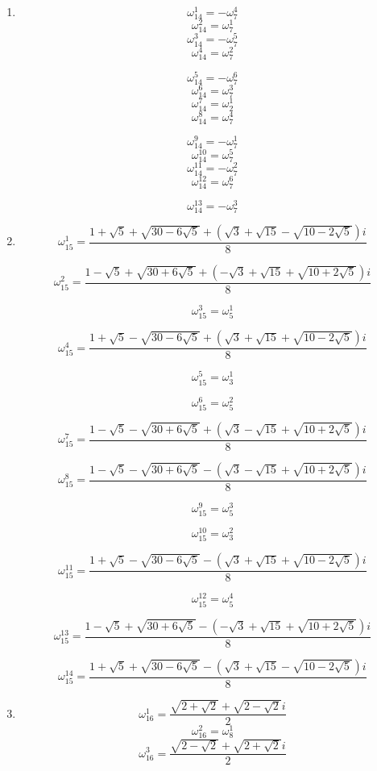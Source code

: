 \documentclass{article}
\begin{document}
\begin{enumerate}
\item \[ \omega_{14}^{1}=-\omega_{7}^{4} \]
\[ \omega_{14}^{2}=\omega_{7}^{1} \]
\[ \omega_{14}^{3}=-\omega_{7}^{5} \]
\[ \omega_{14}^{4}=\omega_{7}^{2} \]

\[ \omega_{14}^{5}=-\omega_{7}^{6} \]
\[ \omega_{14}^{6}=\omega_{7}^{3} \]
\[ \omega_{14}^{7}=\omega_{2}^{1} \]
\[ \omega_{14}^{8}=\omega_{7}^{4} \]

\[ \omega_{14}^{9}=-\omega_{7}^{1} \]
\[ \omega_{14}^{10}=\omega_{7}^{5} \]
\[ \omega_{14}^{11}=-\omega_{7}^{2} \]
\[ \omega_{14}^{12}=\omega_{7}^{6} \]

\[ \omega_{14}^{13}=-\omega_{7}^{3} \]

\item \[ \omega_{15}^{1}=\frac{1+\sqrt{5}+\sqrt{30-6\sqrt{5}}+(\sqrt{3}+\sqrt{15}-\sqrt{10-2\sqrt{5}})i}{8} \]

\[ \omega_{15}^{2}=\frac{1-\sqrt{5}+\sqrt{30+6\sqrt{5}}+(-\sqrt{3}+\sqrt{15}+\sqrt{10+2\sqrt{5}})i}{8} \]

\[ \omega_{15}^{3}=\omega_{5}^{1} \]

\[ \omega_{15}^{4}=\frac{1+\sqrt{5}-\sqrt{30-6\sqrt{5}}+(\sqrt{3}+\sqrt{15}+\sqrt{10-2\sqrt{5}})i}{8} \]

\[ \omega_{15}^{5}=\omega_{3}^{1} \]

\[ \omega_{15}^{6}=\omega_{5}^{2} \]

\[ \omega_{15}^{7}=\frac{1-\sqrt{5}-\sqrt{30+6\sqrt{5}}+(\sqrt{3}-\sqrt{15}+\sqrt{10+2\sqrt{5}})i}{8} \]

\[ \omega_{15}^{8}=\frac{1-\sqrt{5}-\sqrt{30+6\sqrt{5}}-(\sqrt{3}-\sqrt{15}+\sqrt{10+2\sqrt{5}})i}{8} \]

\[ \omega_{15}^{9}=\omega_{5}^{3} \]

\[ \omega_{15}^{10}=\omega_{3}^{2} \]

\[ \omega_{15}^{11}=\frac{1+\sqrt{5}-\sqrt{30-6\sqrt{5}}-(\sqrt{3}+\sqrt{15}+\sqrt{10-2\sqrt{5}})i}{8} \]

\[ \omega_{15}^{12}=\omega_{5}^{4} \]

\[ \omega_{15}^{13}=\frac{1-\sqrt{5}+\sqrt{30+6\sqrt{5}}-(-\sqrt{3}+\sqrt{15}+\sqrt{10+2\sqrt{5}})i}{8} \]

\[ \omega_{15}^{14}=\frac{1+\sqrt{5}+\sqrt{30-6\sqrt{5}}-(\sqrt{3}+\sqrt{15}-\sqrt{10-2\sqrt{5}})i}{8} \]

\item \[ \omega_{16}^{1}=\frac{\sqrt{2+\sqrt{2}}+\sqrt{2-\sqrt{2}}i}{2} \]
\[ \omega_{16}^{2}=\omega_{8}^{1} \]
\[ \omega_{16}^{3}=\frac{\sqrt{2-\sqrt{2}}+\sqrt{2+\sqrt{2}}i}{2} \]


\end{enumerate}
\end{document}
